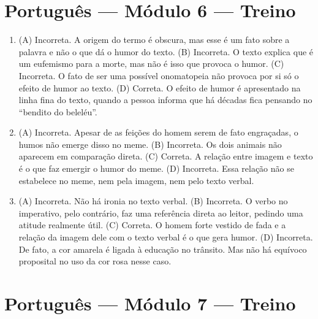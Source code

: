 \section*{Português — Módulo 6 — Treino}

\begin{enumerate}
\item (A) Incorreta. A origem do termo é obscura, mas esse é um fato sobre a
palavra e não o que dá o humor do texto.
(B) Incorreta. O texto explica que é um eufemismo para a morte, mas não é
isso que provoca o humor.
(C) Incorreta. O fato de ser uma possível onomatopeia não provoca por si
só o efeito de humor ao texto.
(D) Correta. O efeito de humor é apresentado na linha fina do texto,
quando a pessoa informa que há décadas fica pensando no ``bendito do
beleléu''.

\item (A) Incorreta. Apesar de as feições do homem serem de fato engraçadas, o
humos não emerge disso no meme.
(B) Incorreta. Os dois animais não aparecem em comparação direta.
(C) Correta. A relação entre imagem e texto é o que faz emergir o humor
do meme.
(D) Incorreta. Essa relação não se estabelece no meme, nem pela imagem,
nem pelo texto verbal.

\item (A) Incorreta. Não há ironia no texto verbal.
(B) Incorreta. O verbo no imperativo, pelo contrário, faz uma referência
direta ao leitor, pedindo uma atitude realmente útil.
(C) Correta. O homem forte vestido de fada e a relação da imagem dele com
o texto verbal é o que gera humor.
(D) Incorreta. De fato, a cor amarela é ligada à educação no trânsito.
Mas não há equívoco proposital no uso da cor rosa nesse caso.
\end{enumerate}

\section*{Português — Módulo 7 — Treino}


